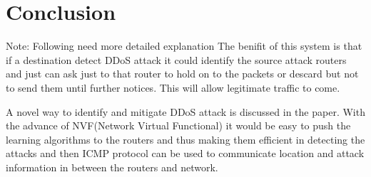 \documentclass[10pt,oneside,a4paper]{article}
\begin{document}
\section{Conclusion}

{Note: Following need more detailed explanation}
The benifit of this system is that if a destination detect DDoS attack it could identify the source attack routers and just can ask just to that router to hold on to the packets or descard but not to send them until further notices. This will allow legitimate traffic to come.

A novel way to identify and mitigate DDoS attack is discussed in the paper. With the advance of NVF(Network Virtual Functional) it would be easy to push the learning algorithms to the routers and thus making them efficient in detecting the attacks and then ICMP protocol can be used to communicate location and attack information in between the routers and network.

\end{document}
